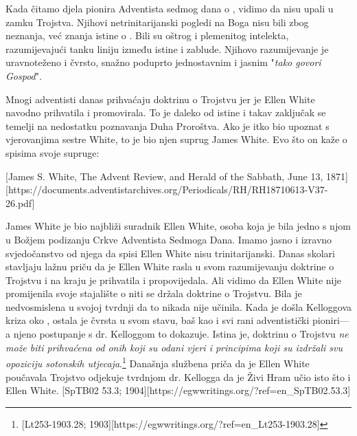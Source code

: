 Kada čitamo djela pionira Adventista sedmog dana o , vidimo da nisu upali u zamku Trojstva. Njihovi netrinitarijanski pogledi na Boga nisu bili zbog neznanja, već znanja istine o . Bili su oštrog i plemenitog intelekta, razumijevajući tanku liniju između istine i zablude. Njihovo razumijevanje  je uravnoteženo i čvrsto, snažno poduprto jednostavnim i jasnim "\textit{tako govori Gospod}".

Mnogi adventisti danas prihvaćaju doktrinu o Trojstvu jer je Ellen White navodno prihvatila i promovirala. To je daleko od istine i takav zaključak se temelji na nedostatku poznavanja Duha Proroštva. Ako je itko bio upoznat s vjerovanjima sestre White, to je bio njen suprug James White. Evo što on kaže o spisima svoje supruge:

[James S. White, The Advent Review, and Herald of the Sabbath, June 13, 1871][https://documents.adventistarchives.org/Periodicals/RH/RH18710613-V37-26.pdf]

James White je bio najbliži suradnik Ellen White, osoba koja je bila jedno s njom u Božjem podizanju Crkve Adventista Sedmoga Dana. Imamo jasno i izravno svjedočanstvo od njega da spisi Ellen White nisu trinitarijanski. Danas skolari stavljaju lažnu priču da je Ellen White rasla u svom razumijevanju doktrine o Trojstvu i na kraju je prihvatila i propovijedala. Ali vidimo da Ellen White nije promijenila svoje stajalište o  niti se držala doktrine o Trojstvu. Bila je nedvosmislena u svojoj tvrdnji da to nikada nije učinila. Kada je došla Kelloggova kriza oko , ostala je čvrsta u svom stavu, baš kao i svi rani adventistički pioniri—a njeno postupanje s dr. Kelloggom to dokazuje. Istina je, doktrinu o Trojstvu \textit{ne može biti prihvaćena od onih koji su odani vjeri i principima koji su izdržali svu opoziciju sotonskih utjecaja}.\footnote{[Lt253-1903.28; 1903][https://egwwritings.org/?ref=en\_Lt253-1903.28]} Današnja službena priča da je Ellen White poučavala Trojstvo odjekuje tvrdnjom dr. Kellogga da je Živi Hram učio isto što i Ellen White. [SpTB02 53.3; 1904][https://egwwritings.org/?ref=en\_SpTB02.53.3]

